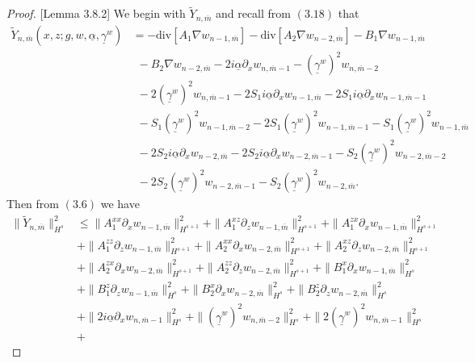 \begin{proof}{[Lemma 3.8.2]} We begin with $\tilde{Y}_{n,\overline{m}}$ and recall from $(3.18)$ that
\begin{align}
\tilde{Y}_{n,\overline{m}}\left(x,z;g,w,\underline{\alpha},\underline{\gamma}^w\right)&=-\text{div}[A_1\nabla w_{n-1,\overline{m}}]-\text{div}[A_2\nabla w_{n-2,\overline{m}}]-B_1\nabla w_{n-1,\overline{m}} 
\nonumber\\&~~- B_2\nabla w_{n-2,\overline{m}}-2i\underline{\alpha}\partial_xw_{n,\overline{m}-1}-(\underline{\gamma}^w)^2w_{n,\overline{m}-2}
\nonumber\\&~~-2(\underline{\gamma}^w)^2w_{n,\overline{m}-1}-2S_1i\underline{\alpha}\partial_xw_{n-1,\overline{m}}-2S_1i\underline{\alpha}\partial_xw_{n-1,\overline{m}-1}
\\&~~-S_1(\underline{\gamma}^w)^2w_{n-1,\overline{m}-2}-2S_1(\underline{\gamma}^w)^2w_{n-1,\overline{m}-1}-S_1(\underline{\gamma}^w)^2w_{n-1,\overline{m}}
\nonumber\\&~~-2S_2i\underline{\alpha}\partial_xw_{n-2,\overline{m}}-2S_2i\underline{\alpha}\partial_xw_{n-2,\overline{m}-1}-S_2(\underline{\gamma}^w)^2w_{n-2,\overline{m}-2}
\nonumber\\&~~-2S_2(\underline{\gamma}^w)^2w_{n-2,\overline{m}-1}-S_2(\underline{\gamma}^w)^2w_{n-2,\overline{m}}.\nonumber
\end{align}
Then from $(3.6)$ we have
\begin{align*}
\|\tilde{Y}_{n,\overline{m}}\|_{H^{s}}^2&\le \|A_1^{xx}\partial_x w_{n-1,\overline{m}}\|_{H^{s+1}}^2 + \|A_1^{xz}\partial_z w_{n-1,\overline{m}}\|_{H^{s+1}}^2 + \|A_1^{zx}\partial_x w_{n-1,\overline{m}}\|_{H^{s+1}}^2 \\&+
\|A_1^{zz}\partial_z w_{n-1,\overline{m}}\|_{H^{s+1}}^2 + \|A_2^{xx}\partial_x w_{n-2,\overline{m}}\|_{H^{s+1}}^2 + \|A_2^{xz}\partial_z w_{n-2,\overline{m}}\|_{H^{s+1}}^2 \\&+
\|A_2^{zx}\partial_x w_{n-2,\overline{m}}\|_{H^{s+1}}^2 + \|A_2^{zz}\partial_z w_{n-2,\overline{m}}\|_{H^{s+1}}^2 + \|B_1^{x}\partial_x w_{n-1,\overline{m}}\|_{H^{s}}^2 \\&+
\|B_1^{z}\partial_z w_{n-1,\overline{m}}\|_{H^{s}}^2 +
\|B_2^{x}\partial_x w_{n-2,\overline{m}}\|_{H^{s}}^2 +
\|B_2^{z}\partial_z w_{n-2,\overline{m}}\|_{H^{s}}^2 \\&+
\|2i\underline{\alpha}\partial_xw_{n,\overline{m}-1}\|_{H^{s}}^2 +
\|(\underline{\gamma}^w)^2w_{n,\overline{m}-2}\|_{H^{s}}^2 +
\|2(\underline{\gamma}^w)^2w_{n,\overline{m}-1}\|_{H^{s}}^2 \\&+

\end{align*}
\end{proof}
